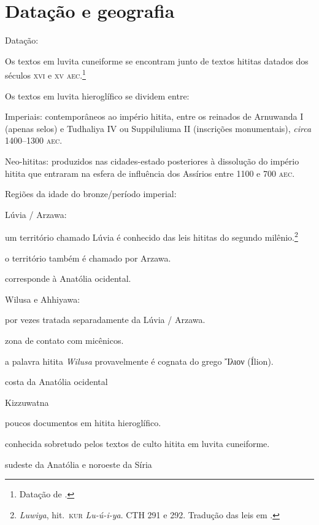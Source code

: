 \documentclass[article]{luvita}
\begin{document}
\chapter{Datação e geografia}

\noindent Datação:

\begin{compactitem}
	\item Os textos em luvita cuneiforme se encontram junto de textos hititas
	datados dos séculos \textsc{xvi} e \textsc{xv} \textsc{aec}.\footnote{Datação de
		\citet{Starke1985}.}
	\item Os textos em luvita hieroglífico se dividem entre:
	\begin{compactitem}
		\item Imperiais: contemporâneos ao império hitita, entre os reinados de
		Arnuwanda I (apenas selos) e Tudhaliya IV ou Suppiluliuma II (inscrições
		monumentais), \emph{circa} 1400--1300 \textsc{aec}.
		\item Neo-hititas: produzidos nas cidades-estado posteriores à dissolução do
		império hitita que entraram na esfera de influência dos Assírios entre 1100
		e 700 \textsc{aec}.
	\end{compactitem}
\end{compactitem}


\noindent Regiões da idade do bronze\slash{}período imperial:
\begin{compactitem}
	\item Lúvia / Arzawa:
	\begin{compactitem}
		\item um território chamado Lúvia é conhecido das leis hititas do segundo
		milênio.\footnote{\emph{Luwiya}, hit.\ \mbox{\textsc{kur}}
			\mbox{\textit{Lu-ú-i-ya}}. CTH 291 e 292. Tradução das leis em
			\textcite{Hoffner1997}.}
		\item o território também é chamado por Arzawa.
		\item corresponde à Anatólia ocidental.
	\end{compactitem}
	\item Wilusa e Ahhiyawa:
	\begin{compactitem}
		\item por vezes tratada separadamente da Lúvia / Arzawa.
		\item zona de contato com micênicos.
		\item a palavra hitita \emph{Wilusa} provavelmente é cognata do grego Ἴλιον
		(Ílion).
		\item costa da Anatólia ocidental
	\end{compactitem}
	\item Kizzuwatna
	\begin{compactitem}
		\item poucos documentos em hitita hieroglífico.
		\item conhecida sobretudo pelos textos de culto hitita em luvita cuneiforme.
		\item sudeste da Anatólia e noroeste da Síria
	\end{compactitem}
\end{compactitem}
\end{document}
